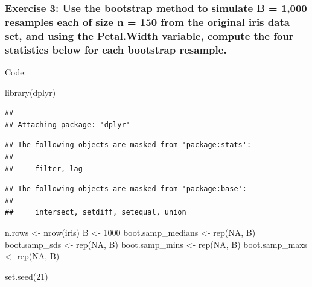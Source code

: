 \documentclass[
]{article}
\newenvironment{Shaded}{\begin{snugshade}}{\end{snugshade}}
\newcommand{\ConstantTok}[1]{\textcolor[rgb]{0.00,0.00,0.00}{#1}}
\newcommand{\DecValTok}[1]{\textcolor[rgb]{0.00,0.00,0.81}{#1}}
\newcommand{\FunctionTok}[1]{\textcolor[rgb]{0.00,0.00,0.00}{#1}}
\newcommand{\NormalTok}[1]{#1}
\newcommand{\OtherTok}[1]{\textcolor[rgb]{0.56,0.35,0.01}{#1}}
\begin{document}
\hypertarget{exercise-3-use-the-bootstrap-method-to-simulate-b-1000-resamples-each-of-size-n-150-from-the-original-iris-data-set-and-using-the-petal.width-variable-compute-the-four-statistics-below-for-each-bootstrap-resample.}{%
\subsubsection{Exercise 3: Use the bootstrap method to simulate B =
1,000 resamples each of size n = 150 from the original iris data set,
and using the Petal.Width variable, compute the four statistics below
for each bootstrap
resample.}\label{exercise-3-use-the-bootstrap-method-to-simulate-b-1000-resamples-each-of-size-n-150-from-the-original-iris-data-set-and-using-the-petal.width-variable-compute-the-four-statistics-below-for-each-bootstrap-resample.}}

Code:

\begin{Shaded}
\begin{Highlighting}[]
\FunctionTok{library}\NormalTok{(dplyr)}
\end{Highlighting}
\end{Shaded}

\begin{verbatim}
## 
## Attaching package: 'dplyr'
\end{verbatim}

\begin{verbatim}
## The following objects are masked from 'package:stats':
## 
##     filter, lag
\end{verbatim}

\begin{verbatim}
## The following objects are masked from 'package:base':
## 
##     intersect, setdiff, setequal, union
\end{verbatim}

\begin{Shaded}
\begin{Highlighting}[]
\NormalTok{n.rows }\OtherTok{\textless{}{-}} \FunctionTok{nrow}\NormalTok{(iris)}
\NormalTok{B }\OtherTok{\textless{}{-}} \DecValTok{1000}
\NormalTok{boot.samp\_medians }\OtherTok{\textless{}{-}} \FunctionTok{rep}\NormalTok{(}\ConstantTok{NA}\NormalTok{, B)}
\NormalTok{boot.samp\_sds }\OtherTok{\textless{}{-}} \FunctionTok{rep}\NormalTok{(}\ConstantTok{NA}\NormalTok{, B)}
\NormalTok{boot.samp\_mins }\OtherTok{\textless{}{-}} \FunctionTok{rep}\NormalTok{(}\ConstantTok{NA}\NormalTok{, B)}
\NormalTok{boot.samp\_maxs }\OtherTok{\textless{}{-}} \FunctionTok{rep}\NormalTok{(}\ConstantTok{NA}\NormalTok{, B)}

\FunctionTok{set.seed}\NormalTok{(}\DecValTok{21}\NormalTok{)}
\end{Highlighting}
\end{Shaded}
\end{document}
